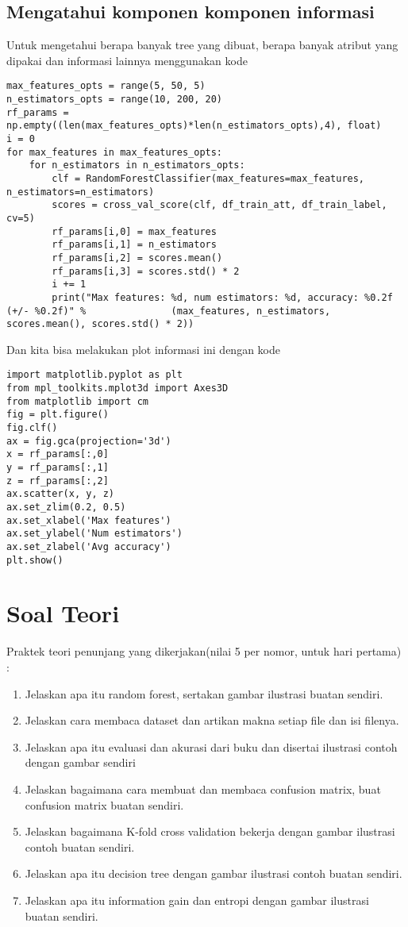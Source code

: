 \subsection{Mengatahui komponen komponen informasi}
Untuk mengetahui berapa banyak tree yang dibuat, berapa banyak atribut yang dipakai dan informasi lainnya menggunakan kode
\begin{lstlisting}[caption=Fungsi Sederhana,label={lst:3.24}]
max_features_opts = range(5, 50, 5)
n_estimators_opts = range(10, 200, 20)
rf_params = np.empty((len(max_features_opts)*len(n_estimators_opts),4), float)
i = 0
for max_features in max_features_opts:
    for n_estimators in n_estimators_opts:
        clf = RandomForestClassifier(max_features=max_features, n_estimators=n_estimators)
        scores = cross_val_score(clf, df_train_att, df_train_label, cv=5)
        rf_params[i,0] = max_features
        rf_params[i,1] = n_estimators
        rf_params[i,2] = scores.mean()
        rf_params[i,3] = scores.std() * 2
        i += 1
        print("Max features: %d, num estimators: %d, accuracy: %0.2f (+/- %0.2f)" %               (max_features, n_estimators, scores.mean(), scores.std() * 2))

\end{lstlisting}
Dan kita bisa melakukan plot informasi ini dengan kode
\begin{lstlisting}[caption=Fungsi Sederhana,label={lst:3.25}]
import matplotlib.pyplot as plt
from mpl_toolkits.mplot3d import Axes3D
from matplotlib import cm
fig = plt.figure()
fig.clf()
ax = fig.gca(projection='3d')
x = rf_params[:,0]
y = rf_params[:,1]
z = rf_params[:,2]
ax.scatter(x, y, z)
ax.set_zlim(0.2, 0.5)
ax.set_xlabel('Max features')
ax.set_ylabel('Num estimators')
ax.set_zlabel('Avg accuracy')
plt.show()
\end{lstlisting}




\section{Soal Teori}
Praktek teori penunjang yang dikerjakan(nilai 5 per nomor, untuk hari pertama) :
\begin{enumerate}
\item
Jelaskan apa itu random forest, sertakan gambar ilustrasi buatan sendiri.
\item
Jelaskan cara membaca dataset dan artikan makna setiap file dan isi filenya.
\item
Jelaskan apa itu evaluasi dan akurasi dari buku dan disertai ilustrasi contoh dengan gambar sendiri
\item
Jelaskan bagaimana cara membuat dan membaca confusion matrix, buat confusion matrix buatan sendiri.
\item
Jelaskan bagaimana K-fold cross validation bekerja dengan gambar ilustrasi contoh buatan sendiri.
\item
Jelaskan apa itu decision tree dengan gambar ilustrasi contoh buatan sendiri.
\item
Jelaskan apa itu information gain dan entropi dengan gambar ilustrasi buatan sendiri.
\end{enumerate}

